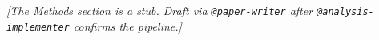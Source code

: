%

\textit{[The Methods section is a stub. Draft via \texttt{@paper-writer} after \texttt{@analysis-implementer} confirms the pipeline.]}
